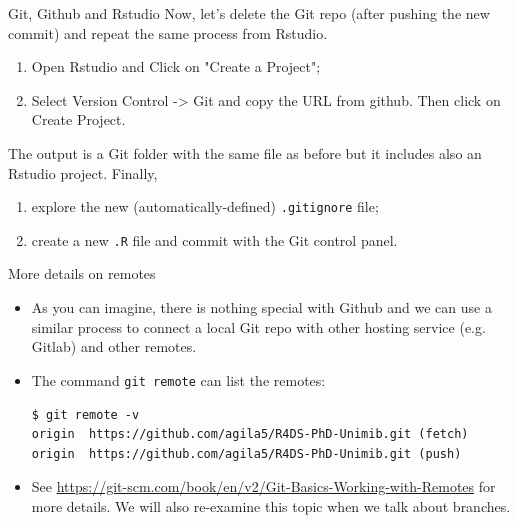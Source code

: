 \documentclass[
hyperref={bookmarks=false},
xcolor={dvipsnames,svgnames*,x11names*}, 
12pt
]{beamer}
\begin{document}
\begin{frame}{Git, Github and Rstudio}
\vspace{-0.5cm}
Now, let's delete the Git repo (after pushing the new commit) and repeat the same process from Rstudio. 
\begin{enumerate}
\itemsep 2ex
\item Open Rstudio and Click on "Create a Project"; 
\item Select Version Control -> Git and copy the URL from github. Then click on Create Project. 
\end{enumerate}
The output is a Git folder with the same file as before but it includes also an Rstudio project. Finally, 
\begin{enumerate}
\item explore the new (automatically-defined) \texttt{.gitignore} file;
\item create a new \texttt{.R} file and commit with the Git control panel.
\end{enumerate}
\end{frame}

\begin{frame}[fragile]{More details on remotes}
\vspace{-0.5cm}
\begin{itemize}
\itemsep 2ex
\item As you can imagine, there is nothing special with Github and we can use a similar process to connect a local Git repo with other hosting service (e.g. Gitlab) and other remotes.  
\item The command \texttt{git remote} can list the remotes: 
\begin{lstlisting}
$ git remote -v
origin  https://github.com/agila5/R4DS-PhD-Unimib.git (fetch)
origin  https://github.com/agila5/R4DS-PhD-Unimib.git (push)
\end{lstlisting}
\item See \url{https://git-scm.com/book/en/v2/Git-Basics-Working-with-Remotes} for more details. We will also re-examine this topic when we talk about branches. 
\end{itemize}
\end{frame}

\end{document}
